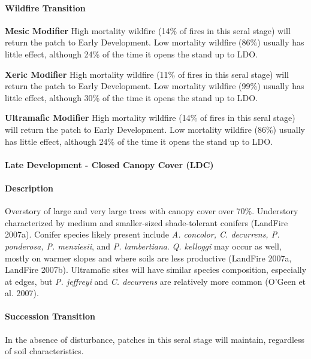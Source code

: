 \paragraph{Wildfire Transition}
\begin{adjustwidth}{2cm}{}
\textbf{Mesic Modifier } High mortality wildfire (14\% of fires in this seral stage) will return the patch to Early Development. Low mortality wildfire (86\%) usually has little effect, although 24\% of the time it opens the stand up to LDO. 

\medskip
\noindent \textbf{Xeric Modifier} High mortality wildfire (11\% of fires in this seral stage) will return the patch to Early Development. Low mortality wildfire (99\%) usually has little effect, although 30\% of the time it opens the stand up to LDO. 

\medskip
\noindent \textbf{Ultramafic Modifier} High mortality wildfire (14\% of fires in this seral stage) will return the patch to Early Development. Low mortality wildfire (86\%) usually has little effect, although 24\% of the time it opens the stand up to LDO. 

\end{adjustwidth}

\noindent\hrulefill

\paragraph{Late Development - Closed Canopy Cover (LDC)}

\paragraph{Description} Overstory of large and very large trees with canopy cover over 70\%. Understory characterized by medium and smaller-sized shade-tolerant conifers (LandFire 2007a). Conifer species likely present include \emph{A. concolor, C. decurrens, P. ponderosa, P. menziesii}, and \emph{P. lambertiana}. \emph{Q. kelloggi} may occur as well, mostly on warmer slopes and where soils are less productive (LandFire 2007a, LandFire 2007b). Ultramafic sites will have similar species composition, especially at edges, but \emph{P. jeffreyi} and \emph{C. decurrens} are relatively more common (O'Geen et al. 2007).

\paragraph{Succession Transition} In the absence of disturbance, patches in this seral stage will maintain, regardless of soil characteristics.

